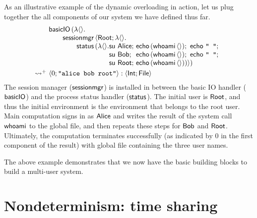 \documentclass[12pt,phd,lfcs,twoside,openright,logo,leftchapter,normalheadings]{infthesis}
\theoremstyle{plain}
\theoremstyle{definition}
\begin{document}
As an illustrative example of the dynamic overloading in action, let
us plug together the all components of our system we have defined thus
far.
%
\[
  \ba{@{~}l@{~}l}
    &\bl
      \basicIO\,(\lambda\Unit.\\
         \qquad\sessionmgr\,\Record{\Root;\lambda\Unit.\\
           \qquad\qquad\status\,(\lambda\Unit.
            \ba[t]{@{}l@{~}l}
              \su~\Alice;&\echo\,(\whoami\,\Unit);~\echo~\strlit{ };\\
              \su~\Bob;  &\echo\,(\whoami\,\Unit);~\echo~\strlit{ };\\
              \su~\Root; &\echo\,(\whoami\,\Unit))})
            \ea
     \el \smallskip\\
   \reducesto^+& \Record{0;\strlit{alice bob root}} : \Record{\Int;\UFile}
 \ea
\]
%
The session manager ($\mathsf{sessionmgr}$) is installed in between the basic
IO handler ($\mathsf{basicIO}$) and the process status handler
($\mathsf{status}$). The initial user is $\mathsf{Root}$, and thus the initial
environment is the environment that belongs to the root user. Main
computation signs in as $\mathsf{Alice}$ and writes the result of the system
call $\mathsf{whoami}$ to the global file, and then repeats these steps for
$\mathsf{Bob}$ and $\mathsf{Root}$.
%
Ultimately, the computation terminates successfully (as indicated by
$0$ in the first component of the result) with global file containing
the three user names.
%

The above example demonstrates that we now have the basic building
blocks to build a multi-user system.
%

\section{Nondeterminism: time sharing}
\label{sec:tiny-unix-time}
\end{document}
